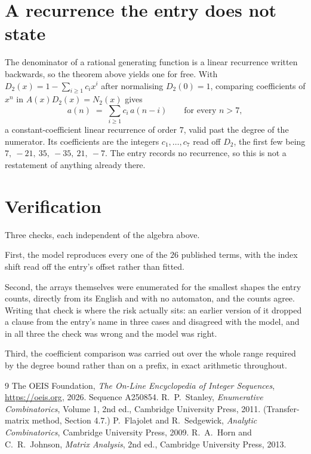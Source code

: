 \documentclass[11pt,a4paper]{article}
\theoremstyle{plain}
\theoremstyle{definition}
\begin{document}
\section{A recurrence the entry does not state}

The denominator of a rational generating function is a linear recurrence written backwards, so
the theorem above yields one for free. With $D_2(x)=1-\sum_{i\ge1}c_ix^i$ after normalising
$D_2(0)=1$, comparing coefficients of $x^n$ in $A(x)D_2(x)=N_2(x)$ gives
\[
a(n)\;=\;\sum_{i\ge1}c_i\,a(n-i)\qquad\text{for every }n>7,
\]
a constant-coefficient linear recurrence of order $7$, valid past the degree of the
numerator. Its coefficients are the integers $c_1,\dots,c_{7}$ read off $D_2$, the first few being $7,\ -21,\ 35,\ -35,\ 21,\ -7$. The entry records no recurrence, so this is not a restatement of anything
already there.

\section{Verification}

Three checks, each independent of the algebra above.

First, the model reproduces every one of the $26$ published terms, with the index shift
read off the entry's offset rather than fitted.

Second, the arrays themselves were enumerated for the smallest shapes the entry counts,
directly from its English and with no automaton, and the counts agree. Writing that check is
where the risk actually sits: an earlier version of it dropped a clause from the entry's name
in three cases and disagreed with the model, and in all three the check was wrong and the model
was right.

Third, the coefficient comparison was carried out over the whole range required by the degree
bound rather than on a prefix, in exact arithmetic throughout.

\begin{thebibliography}{9}
 The OEIS Foundation, \emph{The On-Line Encyclopedia of Integer
Sequences}, \url{https://oeis.org}, 2026. Sequence A250854.
 R.~P.~Stanley, \emph{Enumerative Combinatorics}, Volume 1, 2nd ed.,
Cambridge University Press, 2011. (Transfer-matrix method, Section 4.7.)
 P.~Flajolet and R.~Sedgewick, \emph{Analytic Combinatorics}, Cambridge
University Press, 2009.
 R.~A.~Horn and C.~R.~Johnson, \emph{Matrix Analysis}, 2nd ed., Cambridge
University Press, 2013.
\end{thebibliography}
\end{document}

